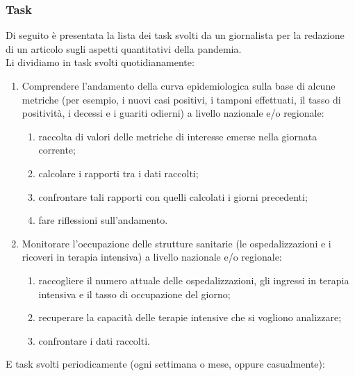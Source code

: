 \subsubsection{Task}
Di seguito è presentata la lista dei task svolti da un giornalista per la redazione di un articolo sugli aspetti quantitativi della pandemia.\\
Li dividiamo in task svolti quotidianamente:
\begin{enumerate}
    \item Comprendere l'andamento della curva epidemiologica sulla base di alcune metriche (per esempio, i nuovi casi positivi, i tamponi effettuati, il tasso di positività, i decessi e i guariti odierni) a livello nazionale e/o regionale:
    \begin{enumerate}[label=\alph*.]
        \item raccolta di valori delle metriche di interesse emerse nella giornata corrente;
        \item calcolare i rapporti tra i dati raccolti;
        \item confrontare tali rapporti con quelli calcolati i giorni precedenti;
        \item fare riflessioni sull'andamento.
    \end{enumerate}
    \item Monitorare l'occupazione delle strutture sanitarie (le ospedalizzazioni e i ricoveri in terapia intensiva) a livello nazionale e/o regionale:
    \begin{enumerate}[label=\alph*.]
        \item raccogliere il numero attuale delle ospedalizzazioni, gli ingressi in terapia intensiva e il tasso di occupazione del giorno;
        \item recuperare la capacità delle terapie intensive che si vogliono analizzare;
        \item confrontare i dati raccolti.
    \end{enumerate}
\end{enumerate}
E task svolti periodicamente (ogni settimana o mese, oppure casualmente):
